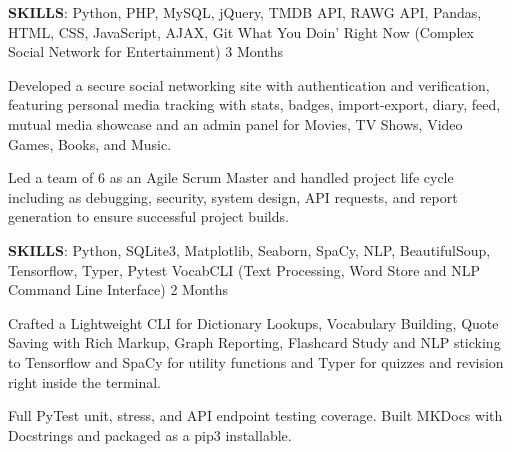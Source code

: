 

\begin{cventries}

  \cventry
    {\textbf{SKILLS}: Python, PHP, MySQL, jQuery, TMDB API, RAWG API, Pandas, HTML, CSS, JavaScript, AJAX, Git} %
    {What You Doin' Right Now (Complex Social Network for Entertainment)} %
    {3 Months} %
    {} %
    {
      \begin{cvitems} %
        \item {Developed a secure social networking site with authentication and verification, featuring personal media tracking with stats, badges, import-export, diary, feed, mutual media showcase and an admin panel for Movies, TV Shows, Video Games, Books, and Music.}
        \item {Led a team of 6 as an Agile Scrum Master and handled project life cycle including as debugging, security, system design, API requests, and report generation to ensure successful project builds.}
      \end{cvitems}
    }

  \cventry
    {\textbf{SKILLS}: Python, SQLite3, Matplotlib, Seaborn, SpaCy, NLP, BeautifulSoup, Tensorflow, Typer, Pytest} %
    {VocabCLI (Text Processing, Word Store and NLP Command Line Interface)} %
    {2 Months} %
    {} %
    {
      \begin{cvitems} %
        \item {Crafted a Lightweight CLI for Dictionary Lookups, Vocabulary Building, Quote Saving with Rich Markup, Graph Reporting, Flashcard Study and NLP sticking to Tensorflow and SpaCy for utility functions and Typer for quizzes and revision right inside the terminal.}
        \item{Full PyTest unit, stress, and API endpoint testing coverage. Built MKDocs with Docstrings and packaged as a pip3 installable.}
      \end{cvitems}
    }


\end{cventries}
